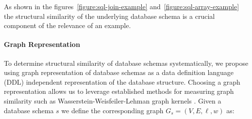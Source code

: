 As shown in the figures~\ref{figure:sql-join-example} and~\ref{figure:sql-array-example}
the structural similarity of the underlying database schema is a crucial component
of the relevance of an example.

\paragraph{Graph Representation}\label{design:graph-repr}

To determine structural similarity of database schemas systematically, we propose
using graph representation of database schemas as a data definition language (DDL)
independent representation of the database structure. Choosing a graph
representation allows us to leverage established methods for measuring graph similarity
such as Wasserstein-Weisfeiler-Lehman graph kernels \citep{WWL}. 
Given a database schema $s$ we define the corresponding graph $G_s = (V, E, \ell, w)$ as:

